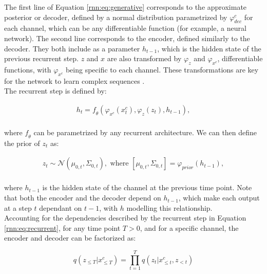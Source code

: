 The first line of Equation \ref{rnn:eq:generative} corresponds to the approximate posterior or decoder, defined by a normal distribution parametrized by $\varphi_{dec}^c$ for each channel, which can be any differentiable function (for example, a neural network). The second line corresponds to the encoder, defined similarly to the decoder. They both include as a parameter $h_{t-1}$, which is the hidden state of the previous recurrent step. $z$ and $x$ are also transformed by $\varphi_{z}$ and $\varphi_{x^c}$, differentiable functions, with $\varphi_{x^c}$ being specific to each channel. These transformations are key for the network to learn complex sequences \cite{Chung2015}.\\

The recurrent step is defined by:

\begin{equation} 
\begin{aligned} \label{rnn:eq:recurrent}
h_{t} = \mathit{f}_{\theta}(\varphi_{x^c}(x^c_{t}), \varphi_{z}(z_t), h_{t-1}), \\
\end{aligned}
\end{equation}

where $\mathit{f}_{\theta}$ can be parametrized by any recurrent architecture. We can then define the prior of $z_t$ as:

\begin{equation}
\begin{gathered} \label{rnn:eq:prior} 
z_t \sim \mathcal{N}(\mu_{0,t},\Sigma_{0,t}), \text{ where } [\mu_{0,t},\Sigma_{0,t}] = \varphi_{prior} (h_{t-1}), \\
\end{gathered}
\end{equation}

where $h_{t-1}$ is the hidden state of the channel at the previous time point. Note that both the encoder and the decoder depend on $h_{t-1}$, which make each output at a step $t$ dependant on $t-1$, with $h$ modelling this relationship. \\

Accounting for the dependencies described by the recurrent step in Equation \ref{rnn:eq:recurrent}, for any time point $T>0$, and for a specific channel, the encoder and decoder can be factorized as:

\begin{equation} \label{eq:decfact}
\mathit{q}(z_{\leq T} | x^c_{\leq T}) = \prod^T_{t=1} \mathit{q}(z_t | x^c_{\leq t}, z_{<t})
\end{equation}

